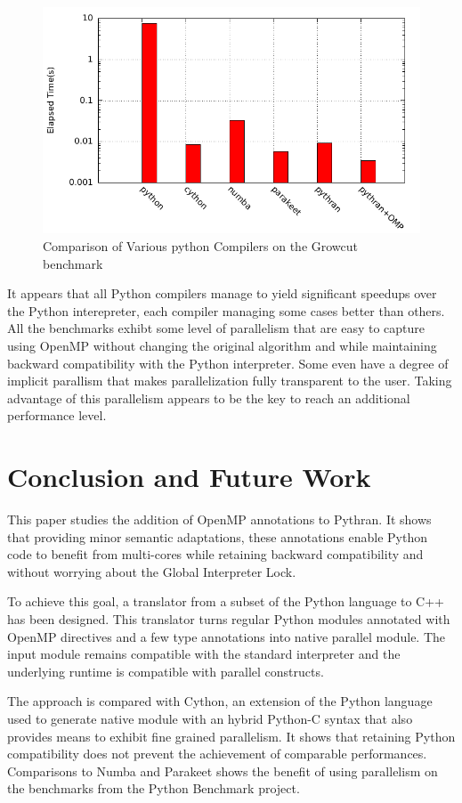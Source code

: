 \documentclass[conference]{IEEEtran}
\begin{document}
\begin{figure}[ht]
    \includegraphics[width=.5\textwidth]{growcut}
    \caption{Comparison of Various python Compilers on the Growcut benchmark}
    \label{fig:pb-growcut}
\end{figure}

It appears that all Python compilers manage to yield significant speedups over
the Python interepreter, each compiler managing some cases better than others.
All the benchmarks exhibt some level of parallelism that are easy to capture
using OpenMP without changing the original algorithm and while maintaining
backward compatibility with the Python interpreter. Some even have a degree of
implicit parallism that makes parallelization fully transparent to the user.
Taking advantage of this parallelism appears to be the key to reach an
additional performance level.


\section{Conclusion and Future Work}

This paper studies the addition of OpenMP annotations to Pythran. It shows that
providing minor semantic adaptations, these annotations enable Python code
to benefit from multi-cores while retaining backward compatibility and without
worrying about the Global Interpreter Lock.

To achieve this goal, a translator from a subset of the Python language to C++
has been designed. This translator turns regular Python modules annotated with
OpenMP directives and a few type annotations into native parallel module. The
input module remains compatible with the standard interpreter and the underlying
runtime is compatible with parallel constructs.

The approach is compared with Cython, an extension of the Python language used
to generate native module with an hybrid Python-C syntax that also provides
means to exhibit fine grained parallelism. It shows that retaining Python
compatibility does not prevent the achievement of comparable performances.
Comparisons to Numba and Parakeet shows the benefit of using parallelism on the
benchmarks from the Python Benchmark project.
\end{document}
